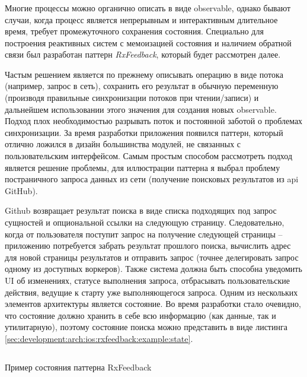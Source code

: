 \subsubsection{}
\label{sec:development:arch:ios:rxfeedback}

Многие процессы можно органично описать в виде \gls{observable}, однако бывают случаи, когда процесс является непрерывным и интерактивным длительное время, требует промежуточного сохранения состояния. Специально для построения реактивных систем с мемоизацией состояния и наличием обратной связи был разработан паттерн \emph{RxFeedback}, который будет рассмотрен далее.

Частым решением является по прежнему описывать операцию в виде потока (например, запрос в сеть), сохранить его результат в обычную переменную (производя правильные синхронизации потоков при чтении/записи) и дальнейшем использовании этого значения для создания новых \gls{observable}. Подход плох необходимостью разрывать поток и постоянной заботой о проблемах синхронизации. За время разработки приложения появился паттерн, который отлично ложился в дизайн большинства модулей, не связанных с пользовательским интерфейсом.
Самым простым способом рассмотреть подход является решение проблемы, для иллюстрации паттерна я выбрал проблему постраничного запроса данных из сети (получение поисковых результатов из \gls{api} GitHub).

Github возвращает результат поиска в виде списка подходящих под запрос сущностей и опциональной ссылки на следующую страницу. Следовательно, когда от пользователя поступит запрос на получение следующей страницы -- приложению потребуется забрать результат прошлого поиска, вычислить адрес для новой страницы результатов и отправить запрос (точнее делегировать запрос одному из доступных воркеров). Также система должна быть способна уведомить UI об изменениях, статусе выполнения запроса, отбрасывать пользовательские действия, ведущие к старту уже выполняющегося запроса.
Одним из нескольких элементов архитектуры является состояние. Во время разработки стало очевидно, что состояние должно хранить в себе всю информацию (как данные, так и утилитарную), поэтому состояние поиска можно представить в виде листинга \ref{sec:development:arch:ios:rxfeedback:example:state}.

\begin{code}
  \inputminted{swift}{inc/src/rx-feedback-state.swift}
   \caption{Пример состояния паттерна RxFeedback}
   \label{sec:development:arch:ios:rxfeedback:example:state}
\end{code}

